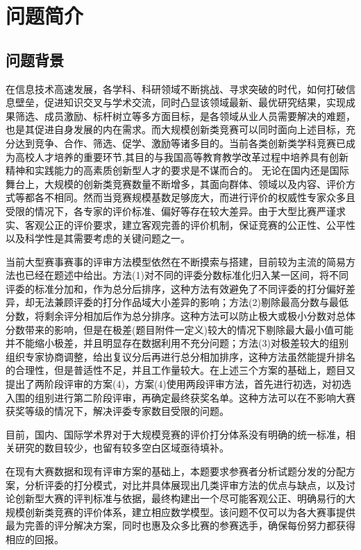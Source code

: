 \documentclass[bwprint]{gmcmthesis}
\begin{document}
\pagestyle{plain}


\section{问题简介}

\subsection{问题背景}
\par
在信息技术高速发展，各学科、科研领域不断挑战、寻求突破的时代，如何打破信息壁垒，促进知识交叉与学术交流，同时凸显该领域最新、最优研究结果，实现成果筛选、成员激励、标杆树立等多方面目标，是各领域从业人员需要解决的难题，也是其促进自身发展的内在需求。而大规模创新类竞赛可以同时面向上述目标，充分达到竞争、合作、筛选、促学、激励等诸多目的。当前各类创新类学科竞赛已成为高校人才培养的重要环节,其目的与我国高等教育教学改革过程中培养具有创新精神和实践能力的高素质创新型人才的要求是不谋而合的。
无论在国内还是国际舞台上，大规模的创新类竞赛数量不断增多，其面向群体、领域以及内容、评价方式等都各不相同。然而当竞赛规模基数足够庞大，而进行评价的权威性专家众多且受限的情况下，各专家的评价标准、偏好等存在较大差异。由于大型比赛严谨求实、客观公正的评价要求，建立客观完善的评价机制，保证竞赛的公正性、公平性以及科学性是其需要考虑的关键问题之一。
\par
当前大型赛事赛事的评审方法模型依然在不断摸索与搭建，目前较为主流的简易方法也已经在题述中给出。方法(1)对不同的评委分数标准化归入某一区间，将不同评委的标准分加和，作为总分后排序，这种方法有效避免了不同评委的打分偏好差异，却无法兼顾评委的打分作品域大小差异的影响；方法(2)剔除最高分数与最低分数，将剩余评分相加后作为总分排序。这种方法可以防止极大或极小分数对总体分数带来的影响，但是在极差(题目附件一定义)较大的情况下剔除最大最小值可能并不能缩小极差，并且明显存在数据利用不充分问题；方法(3)对极差较大的组别组织专家协商调整，给出复议分后再进行总分相加排序，这种方法虽然能提升排名的合理性，但是普适性不足，并且工作量较大。在上述三个方案的基础上，题目又提出了两阶段评审的方案(4)，方案(4)使用两段评审方法，首先进行初选，对初选入围的组别进行第二阶段评审，再确定最终获奖名单。这种方法可以在不影响大赛获奖等级的情况下，解决评委专家数目受限的问题。
\par
目前，国内、国际学术界对于大规模竞赛的评价打分体系没有明确的统一标准，相关研究的数目较少，也留有较多空白区域亟待填补。
\par
在现有大赛数据和现有评审方案的基础上，本题要求参赛者分析试题分发的分配方案，分析评委的打分模式，对比并具体展现出几类评审方法的优点与缺点，以及讨论创新型大赛的评判标准与依据，最终构建出一个尽可能客观公正、明确易行的大规模创新类竞赛的评价体系，建立相应数学模型。该问题不仅可以为各大赛事提供最为完善的评分解决方案，同时也惠及众多比赛的参赛选手，确保每份努力都获得相应的回报。
\end{document}
